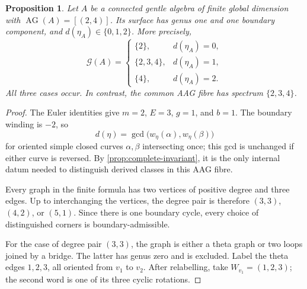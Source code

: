 \documentclass[11pt]{amsart}
\theoremstyle{definition}
\theoremstyle{plain}
\newtheorem{proposition}[proposition]{Proposition}
\theoremstyle{definition}
\theoremstyle{definition}
\newcommand{\AG}{\operatorname{AG}}
\newcommand{\GSpec}{\mathcal G}
\begin{document}
\begin{proposition}
\label{prop:two-four-spectra}
Let $A$ be a connected gentle algebra of finite global dimension with
$\AG(A)=[(2,4)]$.  Its surface has genus one and one boundary component,
and $d(\eta_A)\in\{0,1,2\}$.  More precisely,
\begin{equation}
\label{eq:two-four-spectra}
 \GSpec(A)=
 \begin{cases}
  \{2\},&d(\eta_A)=0,\\
  \{2,3,4\},&d(\eta_A)=1,\\
  \{4\},&d(\eta_A)=2.
 \end{cases}
\end{equation}
All three cases occur.  In contrast, the common AAG fibre has spectrum
$\{2,3,4\}$.
\end{proposition}
\begin{proof}
The Euler identities give $m=2$, $E=3$, $g=1$, and $b=1$.
The boundary winding is $-2$, so
\[
  d(\eta)=\gcd\bigl(w_\eta(\alpha),w_\eta(\beta)\bigr)
\]
for oriented simple closed curves $\alpha,\beta$ intersecting
once; this gcd is unchanged if either curve is reversed.
By \cref{prop:complete-invariant}, it is the only internal datum
needed to distinguish derived classes in this AAG fibre.

Every graph in the finite formula has two vertices of positive
degree and three edges.  Up to interchanging the vertices, the
degree pair is therefore $(3,3)$, $(4,2)$, or $(5,1)$.
Since there is one boundary cycle, every choice of distinguished
corners is boundary-admissible.

For the case of degree pair $(3,3)$, the graph is either a theta graph or two loops joined by a bridge.
The latter has genus zero and is excluded.  Label the theta edges
$1,2,3$, all oriented from $v_1$ to $v_2$.  
After relabelling,
take $W_{v_1}=(1,2,3)$; the second word is one of its three
cyclic rotations.


\end{proof}
\end{document}
